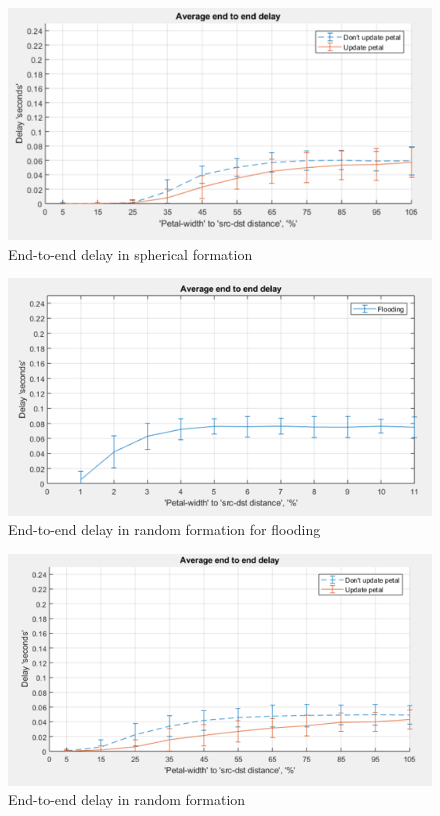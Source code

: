 \begin{figure}[hbtp]
\centering
\includegraphics[width=1\textwidth]{ncsuthesis-0.6/Chapter-5/figs/pe_delay_spherical.png}
\caption{End-to-end delay in spherical formation}
\label{fig:pe_delay_spherical}
\end{figure}

\begin{figure}[hbtp]
\centering
\includegraphics[width=1\textwidth]{ncsuthesis-0.6/Chapter-5/figs/fl_delay_random.png}
\caption{End-to-end delay in random formation for flooding}
\label{fig:fl_delay_random}
\end{figure}

\begin{figure}[hbtp]
\centering
\includegraphics[width=1\textwidth]{ncsuthesis-0.6/Chapter-5/figs/pe_delay_random.png}
\caption{End-to-end delay in random formation}
\label{fig:pe_delay_random}
\end{figure}


